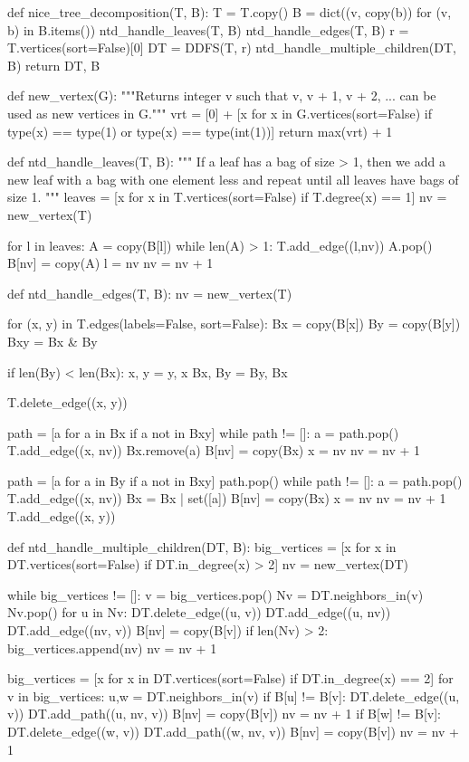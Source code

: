 \begin{sageCell}
def nice_tree_decomposition(T, B):
    T = T.copy()
    B = dict((v, copy(b)) for (v, b) in B.items())
    ntd_handle_leaves(T, B)
    ntd_handle_edges(T, B)
    r = T.vertices(sort=False)[0]
    DT = DDFS(T, r)
    ntd_handle_multiple_children(DT, B)
    return DT, B

def new_vertex(G):
    """Returns integer v such that v, v + 1, v + 2, ... can be used as new vertices in G."""
    vrt = [0] + [x for x in G.vertices(sort=False) if type(x) == type(1) or type(x) == type(int(1))]
    return max(vrt) + 1

def ntd_handle_leaves(T, B):
    """
    If a leaf has a bag of size > 1, then we add a new leaf with a bag with one element less and repeat until all leaves have bags of size 1.
    """
    leaves = [x for x in T.vertices(sort=False) if T.degree(x) == 1]
    nv = new_vertex(T)

    for l in leaves:
        A = copy(B[l])
        while len(A) > 1:
            T.add_edge((l,nv))
            A.pop()
            B[nv] = copy(A)
            l = nv
            nv = nv + 1

def ntd_handle_edges(T, B):
    nv = new_vertex(T)

    for (x, y) in T.edges(labels=False, sort=False):
        Bx = copy(B[x])
        By = copy(B[y])
        Bxy = Bx & By

        if len(By) < len(Bx):
            x, y = y, x
            Bx, By = By, Bx

        T.delete_edge((x, y))

        path = [a for a in Bx if a not in Bxy]
        while path != []:
            a = path.pop()
            T.add_edge((x, nv))
            Bx.remove(a)
            B[nv] = copy(Bx)
            x = nv
            nv = nv + 1

        path = [a for a in By if a not in Bxy]
        path.pop()
        while path != []:
            a = path.pop()
            T.add_edge((x, nv))
            Bx = Bx | set([a])
            B[nv] = copy(Bx)
            x = nv
            nv = nv + 1
        T.add_edge((x, y))

def ntd_handle_multiple_children(DT, B):
    big_vertices = [x for x in DT.vertices(sort=False) if DT.in_degree(x) > 2]
    nv = new_vertex(DT)

    while big_vertices != []:
        v = big_vertices.pop()
        Nv = DT.neighbors_in(v)
        Nv.pop()
        for u in Nv:
            DT.delete_edge((u, v))
            DT.add_edge((u, nv))
        DT.add_edge((nv, v))
        B[nv] = copy(B[v])
        if len(Nv) > 2:
            big_vertices.append(nv)
        nv = nv + 1

    big_vertices = [x for x in DT.vertices(sort=False) if DT.in_degree(x) == 2]
    for v in big_vertices:
        u,w = DT.neighbors_in(v)
        if B[u] != B[v]:
            DT.delete_edge((u, v))
            DT.add_path((u, nv, v))
            B[nv] = copy(B[v])
            nv = nv + 1
        if B[w] != B[v]:
            DT.delete_edge((w, v))
            DT.add_path((w, nv, v))
            B[nv] = copy(B[v])
            nv = nv + 1
\end{sageCell}
